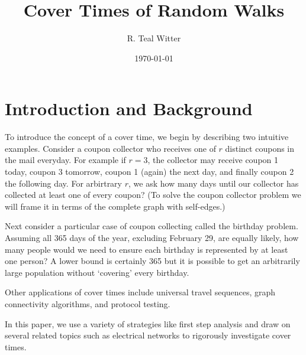 \documentclass[12pt]{article}
\theoremstyle{definition}
\begin{document}
\title{Cover Times of Random Walks}


\author{R. Teal Witter}

\date{\today}



\maketitle


\newpage
\tableofcontents

\newpage
\section{Introduction and Background}\label{sec:intro}

To introduce the concept of a cover time, we begin by describing two intuitive examples.
Consider a coupon collector who receives one of $r$ distinct coupons
in the mail everyday.
For example if $r=3$, the collector may receive coupon 1 today, coupon 3 tomorrow,
coupon 1 (again) the next day, and finally coupon 2 the following day.
For arbirtrary $r$, we ask how many days until our 
collector has collected at least one of every coupon?
(To solve the coupon collector problem we will frame it in terms 
of the complete graph with self-edges.)

Next consider a particular case of coupon collecting called the birthday problem.
Assuming all 365 days of the year, excluding February 29, are equally likely,
how many people would we need to ensure each birthday is represented
by at least one person?
A lower bound is certainly 365 but it is possible to get an arbitrarily
large population without `covering' every birthday.

Other applications of cover times include universal travel sequences,
graph connectivity algorithms, and protocol testing.

In this paper, we use a variety of strategies like first step analysis
and draw on several related topics such as electrical networks to rigorously
investigate cover times.
\end{document}
